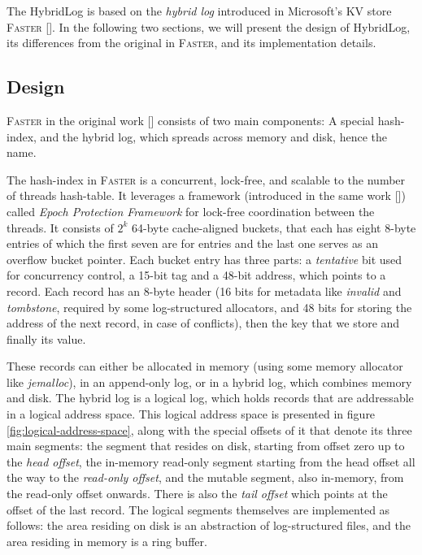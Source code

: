 The HybridLog is based on the \textit{hybrid log} introduced in Microsoft's KV store \textsc{Faster} [\cite{faster}]. In the following two sections, we will present the design of HybridLog, its differences from the original in \textsc{Faster}, and its implementation details.

\subsection{Design}

\textsc{Faster} in the original work [\cite{faster}] consists of two main components: A special hash-index, and the hybrid log, which spreads across memory and disk, hence the name.

The hash-index in \textsc{Faster} is a concurrent, lock-free, and scalable to the number of threads hash-table. It leverages a framework (introduced in the same work [\cite{faster}]) called \textit{Epoch Protection Framework} for lock-free coordination between the threads. It consists of $2^k$ 64-byte cache-aligned buckets, that each has eight 8-byte entries of which the first seven are for entries and the last one serves as an overflow bucket pointer. Each bucket entry has three parts: a \textit{tentative} bit used for concurrency control, a 15-bit tag and a 48-bit address, which points to a record. Each record has an 8-byte header (16 bits for metadata like \textit{invalid} and \textit{tombstone}, required by some log-structured allocators, and 48 bits for storing the address of the next record, in case of conflicts), then the key that we store and finally its value.


These records can either be allocated in memory (using some memory allocator like \textit{jemalloc}), in an append-only log, or in a hybrid log, which combines memory and disk. The hybrid log is a logical log, which holds records that are addressable in a logical address space. This logical address space is presented in figure \ref{fig:logical-address-space}, along with the special offsets of it that denote its three main segments: the segment that resides on disk, starting from offset zero up to the \textit{head offset}, the in-memory read-only segment starting from the head offset all the way to the \textit{read-only offset}, and the mutable segment, also in-memory, from the read-only offset onwards. There is also the \textit{tail offset} which points at the offset of the last record.
The logical segments themselves are implemented as follows: the area residing on disk is an abstraction of log-structured files, and the area residing in memory is a ring buffer.

